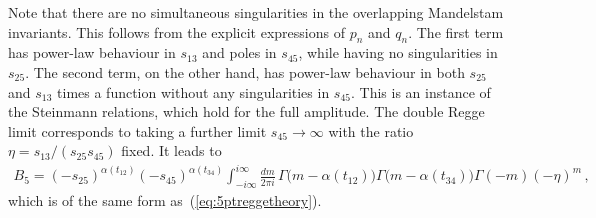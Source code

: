 Note that there are no simultaneous singularities in the overlapping Mandelstam invariants.
This follows from the explicit expressions of $ p_n $ and $ q_n $.
The first term has power-law behaviour in $ s_{13} $ and poles in $s_{45} $, while having no singularities in $ s_{25} $.
The second term, on the other hand, has power-law behaviour in both $ s_{25} $ and $ s_{13} $ times a function without any singularities in $s_{45}$.
This is an instance of the Steinmann relations, which hold for the full amplitude.
The double Regge limit corresponds to taking a further limit $ s_{45} \rightarrow \infty $ with the ratio $\eta= s_{13}/\left( s_{25} s_{45} \right) $ fixed.
It leads to \cite{Brower:1974yv}
\begin{align}
  B_5 = \left( -s_{25} \right)^{\alpha(t_{12})} \left( -s_{45} \right)^{\alpha(t_{34})}
  \int_{-i \infty}^{i \infty}  \frac{dm}{2\pi i}  \, \Gamma\big( m- \alpha(t_{12}) \big)\Gamma\big( m- \alpha(t_{34}) \big)
  \Gamma (-m) \left( -\eta\right)^{m}\,,
  \label{eq:doubleReggeBR}
\end{align}
which is of the same form as~(\ref{eq:5ptreggetheory}).

